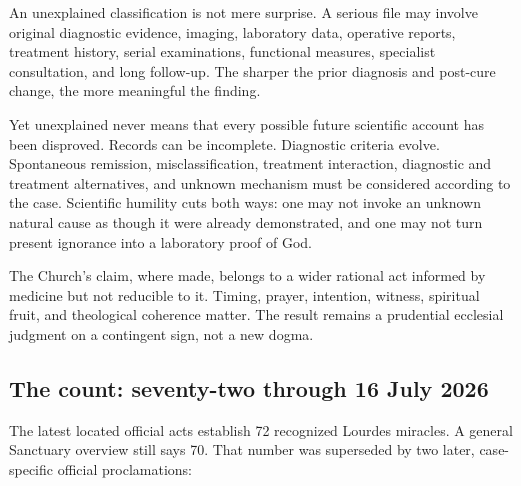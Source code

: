 An unexplained classification is not mere surprise. A serious file may involve original diagnostic evidence, imaging, laboratory data, operative reports, treatment history, serial examinations, functional measures, specialist consultation, and long follow-up. The sharper the prior diagnosis and post-cure change, the more meaningful the finding.

Yet unexplained never means that every possible future scientific account has been disproved. Records can be incomplete. Diagnostic criteria evolve. Spontaneous remission, misclassification, treatment interaction, diagnostic and treatment alternatives, and unknown mechanism must be considered according to the case. Scientific humility cuts both ways: one may not invoke an unknown natural cause as though it were already demonstrated, and one may not turn present ignorance into a laboratory proof of God.

The Church's claim, where made, belongs to a wider rational act informed by medicine but not reducible to it. Timing, prayer, intention, witness, spiritual fruit, and theological coherence matter. The result remains a prudential ecclesial judgment on a contingent sign, not a new dogma.

\subsection{The count: seventy-two through 16 July 2026}

The latest located official acts establish 72 recognized Lourdes miracles. A general Sanctuary overview still says 70. That number was superseded by two later, case-specific official proclamations:

